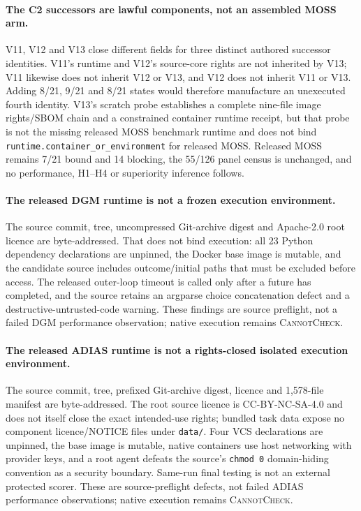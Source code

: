 \paragraph{The C2 successors are lawful components, not an assembled MOSS arm.}
V11, V12 and V13 close different fields for three distinct authored successor
identities. V11's runtime and V12's source-core rights are not inherited by
V13; V11 likewise does not inherit V12 or V13, and V12 does not inherit V11 or
V13. Adding 8/21, 9/21 and 8/21 states would therefore manufacture an
unexecuted fourth identity. V13's scratch probe establishes a complete
nine-file image rights/SBOM chain and a constrained container runtime receipt,
but that probe is not the missing released MOSS benchmark runtime and does not
bind \texttt{runtime.container\_or\_environment} for released MOSS. Released
MOSS remains 7/21 bound and 14 blocking, the 55/126 panel census is unchanged,
and no performance, H1--H4 or superiority inference follows.

\paragraph{The released DGM runtime is not a frozen execution environment.}
The source commit, tree, uncompressed Git-archive digest and Apache-2.0 root
licence are byte-addressed. That does not bind execution: all 23 Python
dependency declarations are unpinned, the Docker base image is mutable, and
the candidate source includes outcome/initial paths that must be excluded
before access. The released outer-loop timeout is called only after a future
has completed, and the source retains an argparse choice concatenation defect
and a destructive-untrusted-code warning. These findings are source preflight,
not a failed DGM performance observation; native execution remains
\textsc{CannotCheck}.

\paragraph{The released ADIAS runtime is not a rights-closed isolated execution environment.}
The source commit, tree, prefixed Git-archive digest, licence and 1,578-file
manifest are byte-addressed. The root source licence is CC-BY-NC-SA-4.0 and
does not itself close the exact intended-use rights; bundled task data expose
no component licence/NOTICE files under \texttt{data/}. Four VCS declarations
are unpinned, the base image is mutable, native containers use host networking
with provider keys, and a root agent defeats the source's \texttt{chmod 0}
domain-hiding convention as a security boundary. Same-run final testing is not
an external protected scorer. These are source-preflight defects, not failed
ADIAS performance observations; native execution remains
\textsc{CannotCheck}.

